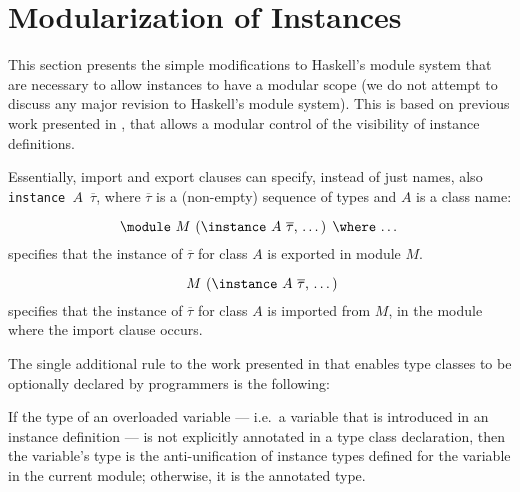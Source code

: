 \section{Modularization of Instances}
\label{sec:modular-instances}

This section presents the simple modifications to Haskell's module
system that are necessary to allow instances to have a modular scope
(we do not attempt to discuss any major revision to Haskell's module
system). This is based on previous work presented in
\cite{Controlling-scope-instances}, that allows a modular control of
the visibility of instance definitions.

Essentially, import and export clauses can specify, instead of just
names, also {\tt instance $A$ $\overline{\tau}$}, where
$\overline{\tau}$ is a (non-empty) sequence of types and $A$ is a
class name:

  \[ \text{\module\ $M$ (\instance\ $A$ $\overline{\tau}$, \ldots) \where\ \ldots} \]
specifies that the instance of $\overline{\tau}$ for class $A$ is
exported in module $M$.

  \[ \text{\ $M$ (\instance\ $A$ $\overline{\tau}$, \ldots)} \]
specifies that the instance of $\overline{\tau}$ for class $A$ is
imported from $M$, in the module where the import clause occurs.

The single additional rule to the work presented in
\cite{Controlling-scope-instances} that enables type classes to be
optionally declared by programmers is the following:

\begin{Definition}
If the type of an overloaded variable --- i.e.~a variable that is
introduced in an instance definition --- is not explicitly annotated
in a type class declaration, then the variable's type is the
anti-unification of instance types defined for the variable in the
current module; otherwise, it is the annotated type.

\label{overloaded-variable-type}
\end{Definition}



